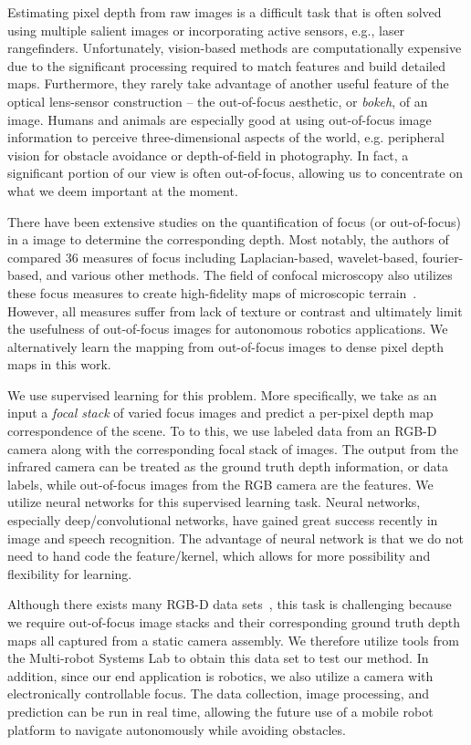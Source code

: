 \documentclass[letterpaper, 10 pt, conference]{ieeeconf}  %
\begin{document}
Estimating pixel depth from raw images is a difficult task that is often solved using multiple salient images or incorporating active sensors, e.g., laser rangefinders. Unfortunately, vision-based methods are computationally expensive due to the significant processing required to match features and build detailed maps. Furthermore, they rarely take advantage of another useful feature of the optical lens-sensor construction -- the out-of-focus aesthetic, or \textit{bokeh}, of an image. Humans and animals are especially good at using out-of-focus image information to perceive three-dimensional aspects of the world, e.g. peripheral vision for obstacle avoidance or depth-of-field in photography. In fact, a significant portion of our view is often out-of-focus, allowing us to concentrate on what we deem important at the moment. 

There have been extensive studies on the quantification of focus (or out-of-focus) in a image to determine the corresponding depth. Most notably, the authors of~\cite{pertuz2013analysis} compared 36 measures of focus including Laplacian-based, wavelet-based, fourier-based, and various other methods. The field of confocal microscopy also utilizes these focus measures to create high-fidelity maps of microscopic terrain~\cite{nayar1994shape}. However, all measures suffer from lack of texture or contrast and ultimately limit the usefulness of out-of-focus images for autonomous robotics applications. We alternatively learn the mapping from out-of-focus images to dense pixel depth maps in this work. 

We use supervised learning for this problem. More specifically, we take as an input a \textit{focal stack} of varied focus images and predict a per-pixel depth map correspondence of the scene. To to this, we use labeled data from an RGB-D camera along with the corresponding focal stack of images. The output from the infrared camera can be treated as the ground truth depth information, or data labels, while out-of-focus images from the RGB camera are the features. We utilize neural networks for this supervised learning task. Neural networks, especially deep/convolutional networks, have gained great success recently in image and speech recognition. The advantage of neural network is that we do not need to hand code the feature/kernel, which allows for more possibility and flexibility for learning. 

Although there exists many RGB-D data sets~\cite{lai2011large, sturm2012benchmark, shotton2013scene}, this task is challenging because we require out-of-focus image stacks and their corresponding ground truth depth maps all captured from a static camera assembly. We therefore utilize tools from the Multi-robot Systems Lab to obtain this data set to test our method. In addition, since our end application is robotics, we also utilize a camera with electronically controllable focus. The data collection, image processing, and prediction can be run in real time, allowing the future use of a mobile robot platform to navigate autonomously while avoiding obstacles. 
\end{document}
